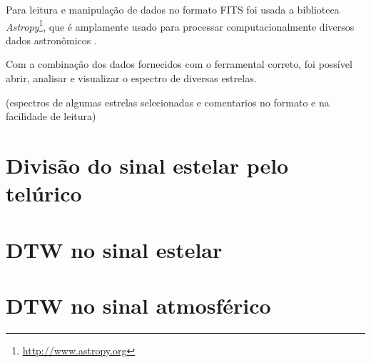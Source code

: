 Para leitura e manipulação de dados no formato FITS foi usada a biblioteca \textit{Astropy}\footnote{\url{http://www.astropy.org}}, que é amplamente usado para processar computacionalmente diversos dados astronômicos \citep{astropy:2018}. 

Com a combinação dos dados fornecidos com o ferramental correto, foi possível abrir, analisar e visualizar o espectro de diversas estrelas.

(espectros de algumas estrelas selecionadas e comentarios no formato e na facilidade de leitura)

\section{Divisão do sinal estelar pelo telúrico}

\section{DTW no sinal estelar}

\section{DTW no sinal atmosférico}